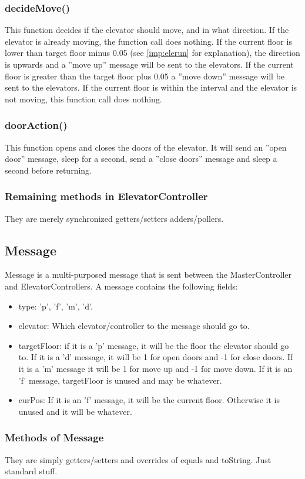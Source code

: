 \subsubsection{decideMove()}
This function decides if the elevator should move, and in what direction.\newline
If the elevator is already moving, the function call does nothing.\newline
If the current floor is lower than target floor minus 0.05 (see \cref{imp:elerun} for explanation), the direction is upwards and a ''move up'' message will be sent to the elevators.\newline
If the current floor is greater than the target floor plus 0.05 a ''move down'' message will be sent to the elevators.\newline
If the current floor is within the interval and the elevator is not moving, this function call does nothing.

\subsubsection{doorAction()}
\label{imp:doorAction}
This function opens and closes the doors of the elevator.
It will send an ''open door'' message, sleep for a second, send a ''close doors'' message and sleep a second before returning.

\subsubsection{Remaining methods in ElevatorController}
They are merely synchronized getters/setters adders/pollers.

\subsection{Message}
Message is a multi-purposed message that is sent between the MasterController and ElevatorControllers. \newline
A message contains the following fields:
\begin{itemize}
\item type: 'p', 'f', 'm', 'd'.
\item elevator: Which elevator/controller to the message should go to.
\item targetFloor: if it is a 'p' message, it will be the floor the elevator should go to. If it is a 'd' message, it will be 1 for open doors and -1 for close doors. If it is a 'm' message it will be 1 for move up and -1 for move down. If it is an 'f' message, targetFloor is unused and may be whatever.
\item curPos: If it is an 'f' message, it will be the current floor. Otherwise it is unused and it will be whatever.
\end{itemize}

\subsubsection{Methods of Message}
They are simply getters/setters and overrides of equals and toString. Just standard stuff.